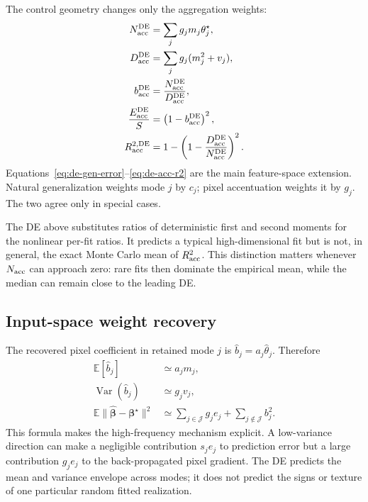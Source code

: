 \documentclass[11pt]{article}
\newcommand{\E}{\mathbb{E}}
\newcommand{\Var}{\operatorname{Var}}
\newcommand{\bhat}{\widehat{\bm\beta}}
\newcommand{\bstar}{\bm\beta^{\star}}
\begin{document}
The control geometry changes only the aggregation weights:
\begin{align}
  N_{\rm acc}^{\rm DE}
    &=\sum_j g_jm_j\theta_j^{\star},\\
  D_{\rm acc}^{\rm DE}
    &=\sum_j g_j(m_j^2+v_j),\\
  b_{\rm acc}^{\rm DE}
    &=\frac{N_{\rm acc}^{\rm DE}}{D_{\rm acc}^{\rm DE}},
    \label{eq:de-acc-slope}\\
  \frac{E_{\rm acc}^{\rm DE}}{S}
    &=\left(1-b_{\rm acc}^{\rm DE}\right)^2,\\
  R_{\rm acc}^{2,\rm DE}
    &=1-\left(1-\frac{D_{\rm acc}^{\rm DE}}
                            {N_{\rm acc}^{\rm DE}}\right)^2.
    \label{eq:de-acc-r2}
\end{align}
Equations~\eqref{eq:de-gen-error}--\eqref{eq:de-acc-r2} are the main
feature-space extension.  Natural generalization weights mode $j$ by $c_j$;
pixel accentuation weights it by $g_j$.  The two agree only in special cases.

The DE above substitutes ratios of deterministic first and second moments for
the nonlinear per-fit ratios.  It predicts a typical high-dimensional fit but
is not, in general, the exact Monte Carlo mean of $R^2_{\rm acc}$.  This
distinction matters whenever $N_{\rm acc}$ can approach zero: rare fits then
dominate the empirical mean, while the median can remain close to the leading
DE.

\subsection{Input-space weight recovery}

The recovered pixel coefficient in retained mode $j$ is
$\widehat b_j=a_j\widehat\theta_j$.  Therefore
\begin{align}
  \E[\widehat b_j]&\simeq a_jm_j,\\
  \Var(\widehat b_j)&\simeq g_jv_j,\\
  \E\lVert\bhat-\bstar\rVert^2
    &\simeq \sum_{j\in\mathcal J}g_je_j
          +\sum_{j\notin\mathcal J}b_j^2.
  \label{eq:de-pixel-weight-error}
\end{align}
This formula makes the high-frequency mechanism explicit.  A low-variance
direction can make a negligible contribution $s_j e_j$ to prediction error
but a large contribution $g_je_j$ to the back-propagated pixel gradient.
The DE predicts the mean and variance envelope across modes; it does not
predict the signs or texture of one particular random fitted realization.
\end{document}
